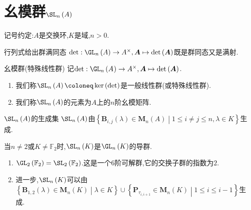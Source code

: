 \section{幺模群\texorpdfstring{$\SL_{n}\left(A\right)$}{SL(n,A)}}

记号约定:$A$是交换环,$K$是域,$n>0$.

\begin{proposition}{行列式给出群满同态}{}
	$\det:\GL_{n}\left(A\right)\to A^{\times},\boldsymbol{A}\mapsto\det\left(\boldsymbol{A}\right)$既是群同态又是满射.
\end{proposition}

\begin{definition}{幺模群(特殊线性群)}{}
	记$\det:\GL_{n}\left(A^{}\right)\to A^{\times},\boldsymbol{A}\mapsto\det\left(\boldsymbol{A}\right)$.
	\begin{enumerate}
		\item 我们称$\SL_{n}\left(A\right)\coloneq\ker\left(\det\right)$是一般线性群(或特殊线性群).
		\item 我们称$\SL_{n}\left(A\right)$的元素为$A$上的$n$阶幺模矩阵.
	\end{enumerate}
\end{definition}

\begin{proposition}{$\SL_{n}\left(A\right)$的生成集}{}
	$\SL_{n}\left(A\right)$由$\left\{\boldsymbol{B}_{i,j}\left(\lambda\right)\in\mathbf{M}_{n}\left(A\right)\middle|1\leq i\neq j\leq n,\lambda\in K\right\}$生成.
\end{proposition}

\begin{corollary}{}{}
	当$n\neq 2$或$K\neq\mathbb{F}_{2}$时,$\SL_{n}\left(K\right)$是$\GL_{n}\left(K\right)$的导群.
\end{corollary}

\begin{remark}{}{}
	\begin{enumerate}
		\item $\GL_{2}\left(\mathbb{F}_{2}\right)=\SL_{2}\left(\mathbb{F}_{2}\right)$.这是一个$6$阶可解群,它的交换子群的指数为$2$.
		\item 进一步,$\SL_{n}\left(K\right)$可以由$\left\{\boldsymbol{B}_{1,2}\left(\lambda\right)\in\mathbf{M}_{n}\left(K\right)\middle|\lambda\in K\right\}\cup\left\{\boldsymbol{P}_{\tau_{i,i+1}}\in\mathbf{M}_{n}\left(K\right)\middle|1\leq i\leq i-1\right\}$生成.
	\end{enumerate}
\end{remark}































